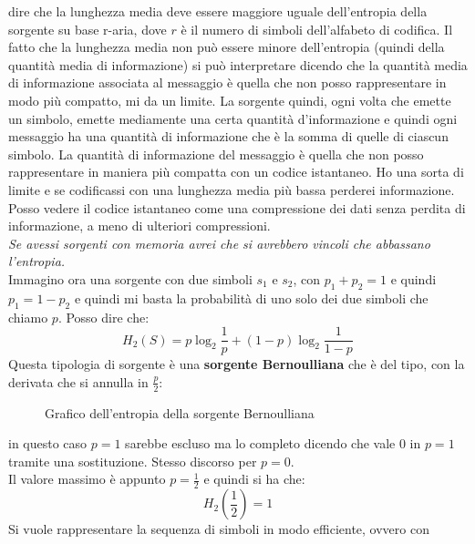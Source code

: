 \documentclass[a4paper,12pt, oneside]{book}
\begin{document}
dire che la lunghezza media deve essere maggiore uguale dell'entropia della
sorgente su base r-aria, dove $r$ è il numero di simboli dell'alfabeto di
codifica. Il fatto che la lunghezza media non può essere minore dell'entropia
(quindi della quantità media di informazione)
si può interpretare dicendo che la quantità media di informazione associata al
messaggio è quella che non posso rappresentare in modo più compatto, mi da un
limite. La sorgente quindi, ogni volta che emette un simbolo, emette mediamente
una certa quantità d'informazione e quindi ogni messaggio ha una quantità di
informazione che è la somma di quelle di ciascun simbolo. La quantità di
informazione del messaggio è quella che non posso rappresentare in maniera più
compatta con un codice istantaneo. Ho una sorta di limite e se codificassi con
una lunghezza media più bassa perderei informazione. Posso vedere il codice
istantaneo come una compressione dei dati senza perdita di informazione, a meno
di ulteriori compressioni.\\
\textit{Se avessi sorgenti con memoria avrei che si avrebbero vincoli che
  abbassano l'entropia.} \\
Immagino ora una sorgente con due simboli $s_1$ e $s_2$, con $p_1+p_2=1$ e
quindi $p_1=1-p_2$ e quindi mi basta la probabilità di uno solo dei due simboli
che chiamo $p$. Posso dire che:
\[H_2(S)=p\log_2\frac{1}{p}+(1-p)\log_2\frac{1}{1-p}\]
Questa tipologia di sorgente è una \textbf{sorgente Bernoulliana} che è del
tipo, con la derivata che si annulla in $\frac{p}{2}$:
\begin{figure}[H]
  \centering
  \caption{Grafico dell'entropia della sorgente Bernoulliana}
  \label{fig:ber}
\end{figure}
in questo caso $p=1$ sarebbe escluso ma lo completo dicendo che vale 0 in $p=1$
tramite una sostituzione. Stesso discorso per $p=0$. \\
Il valore massimo è appunto $p=\frac{1}{2}$ e quindi si ha che:
\[H_2\left(\frac{1}{2}\right)=1\]
Si vuole rappresentare la sequenza di simboli in modo efficiente, ovvero con
\end{document}
